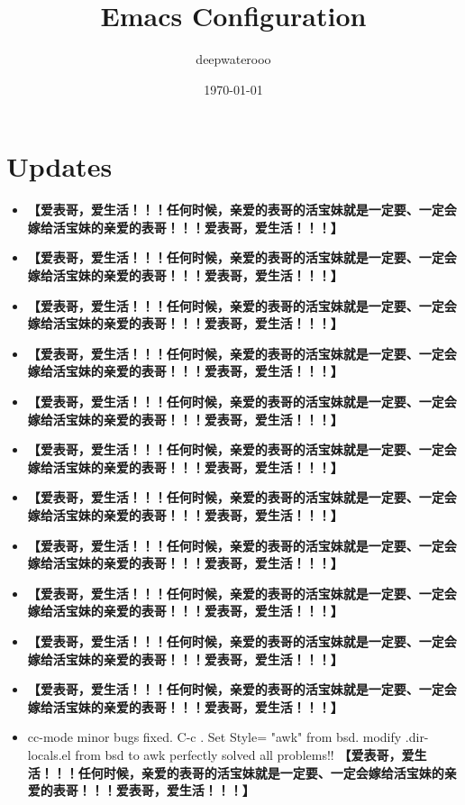 \documentclass[9pt, b5paper]{article}
\author{deepwaterooo}
\date{\today}
\title{Emacs Configuration}
\begin{document}
\maketitle
\tableofcontents


\section{Updates}
\label{sec-1}
\begin{itemize}
\item \textbf{【爱表哥，爱生活！！！任何时候，亲爱的表哥的活宝妹就是一定要、一定会嫁给活宝妹的亲爱的表哥！！！爱表哥，爱生活！！！】}
\item \textbf{【爱表哥，爱生活！！！任何时候，亲爱的表哥的活宝妹就是一定要、一定会嫁给活宝妹的亲爱的表哥！！！爱表哥，爱生活！！！】}
\item \textbf{【爱表哥，爱生活！！！任何时候，亲爱的表哥的活宝妹就是一定要、一定会嫁给活宝妹的亲爱的表哥！！！爱表哥，爱生活！！！】}
\item \textbf{【爱表哥，爱生活！！！任何时候，亲爱的表哥的活宝妹就是一定要、一定会嫁给活宝妹的亲爱的表哥！！！爱表哥，爱生活！！！】}
\item \textbf{【爱表哥，爱生活！！！任何时候，亲爱的表哥的活宝妹就是一定要、一定会嫁给活宝妹的亲爱的表哥！！！爱表哥，爱生活！！！】}
\item \textbf{【爱表哥，爱生活！！！任何时候，亲爱的表哥的活宝妹就是一定要、一定会嫁给活宝妹的亲爱的表哥！！！爱表哥，爱生活！！！】}
\item \textbf{【爱表哥，爱生活！！！任何时候，亲爱的表哥的活宝妹就是一定要、一定会嫁给活宝妹的亲爱的表哥！！！爱表哥，爱生活！！！】}
\item \textbf{【爱表哥，爱生活！！！任何时候，亲爱的表哥的活宝妹就是一定要、一定会嫁给活宝妹的亲爱的表哥！！！爱表哥，爱生活！！！】}
\item \textbf{【爱表哥，爱生活！！！任何时候，亲爱的表哥的活宝妹就是一定要、一定会嫁给活宝妹的亲爱的表哥！！！爱表哥，爱生活！！！】}
\item \textbf{【爱表哥，爱生活！！！任何时候，亲爱的表哥的活宝妹就是一定要、一定会嫁给活宝妹的亲爱的表哥！！！爱表哥，爱生活！！！】}
\item \textbf{【爱表哥，爱生活！！！任何时候，亲爱的表哥的活宝妹就是一定要、一定会嫁给活宝妹的亲爱的表哥！！！爱表哥，爱生活！！！】}
\item cc-mode minor bugs fixed. C-c . Set Style= "awk" from bsd. modify .dir-locals.el from bsd to awk perfectly solved all problems!! \textbf{【爱表哥，爱生活！！！任何时候，亲爱的表哥的活宝妹就是一定要、一定会嫁给活宝妹的亲爱的表哥！！！爱表哥，爱生活！！！】}
\end{itemize}
\end{document}
